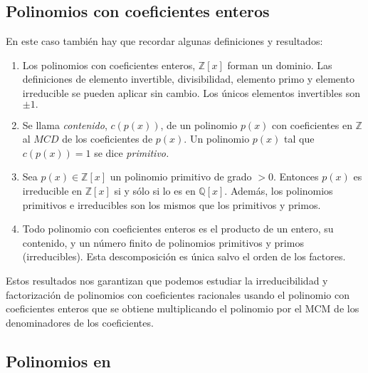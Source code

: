 \subsection{Polinomios con coeficientes enteros}

En este caso tambi\'en hay que recordar algunas definiciones y resultados:
\begin{enumerate}
\item Los polinomios con coeficientes enteros, $\mathbb{Z}[x]$  forman un
dominio. Las definiciones de elemento invertible, divisibilidad, elemento primo
y elemento irreducible se pueden aplicar sin cambio. Los \'unicos elementos
invertibles son $\pm 1.$

\item Se llama {\itshape  contenido}, $c(p(x))$,  de
un polinomio $p(x)$ con coeficientes en $\mathbb{Z}$  al $MCD$  de los
coeficientes de $p(x)$. Un polinomio $p(x)$ tal que $c(p(x))=1$ se dice
{\itshape primitivo.}

\item Sea $p(x)\in \mathbb{Z}[x]$ un polinomio primitivo de grado $>0$. Entonces
$p(x)$ es irreducible en 
 $\mathbb{Z}[x]$ si y s\'olo si lo es en $\mathbb{Q}[x]$. Adem\'as, los
polinomios primitivos e irreducibles son los mismos que los primitivos y primos.
 
 \item Todo polinomio con coeficientes enteros es el producto de un entero, su
contenido,  y un n\'umero finito de polinomios primitivos y primos
(irreducibles). Esta descomposici\'on es \'unica salvo el orden de los
factores. 
 
\end{enumerate}

 Estos resultados nos garantizan que podemos estudiar la irreducibilidad y
factorizaci\'on de polinomios con coeficientes racionales usando el polinomio
con coeficientes enteros que se obtiene multiplicando el polinomio por el MCM de
los denominadores de los coeficientes.
 
 
 
 
 
 
 \subsection{Polinomios en {\sage}}
 

